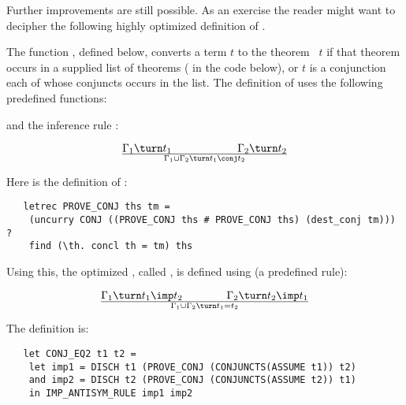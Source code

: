 Further improvements are still possible. As an exercise the reader
might want to decipher the following highly optimized definition of
.

The function , defined below,
converts a term $t$ to the theorem \ml{|-}~$t$
if that theorem occurs in a supplied list of theorems ( in the
code below), or $t$ is a conjunction each of whose conjuncts occurs in
the list. The definition of  uses the following
predefined \ML{} functions:


\noindent and the inference rule :


\[ \Gamma_1\turn
t_1\qquad\qquad\qquad\Gamma_2\turn t_2\over \Gamma_1\cup\Gamma_2 \turn t_1\conj
t_2 \]


\noindent Here is the definition of :

\begin{hol}\begin{verbatim}
   letrec PROVE_CONJ ths tm =
    (uncurry CONJ ((PROVE_CONJ ths # PROVE_CONJ ths) (dest_conj tm))) ?
    find (\th. concl th = tm) ths
\end{verbatim}\end{hol}

\noindent Using this, the optimized , called
, is defined using  (a predefined rule):


\[ \Gamma_1 \turn t_1 \imp t_2 \qquad\qquad \Gamma_2\turn t_2 \imp t_1\over
\Gamma_1 \cup \Gamma_2 \turn t_1 = t_2\]

\noindent The definition is:

\begin{hol}\begin{verbatim}
   let CONJ_EQ2 t1 t2 =
    let imp1 = DISCH t1 (PROVE_CONJ (CONJUNCTS(ASSUME t1)) t2)
    and imp2 = DISCH t2 (PROVE_CONJ (CONJUNCTS(ASSUME t2)) t1)
    in IMP_ANTISYM_RULE imp1 imp2
\end{verbatim}\end{hol}

